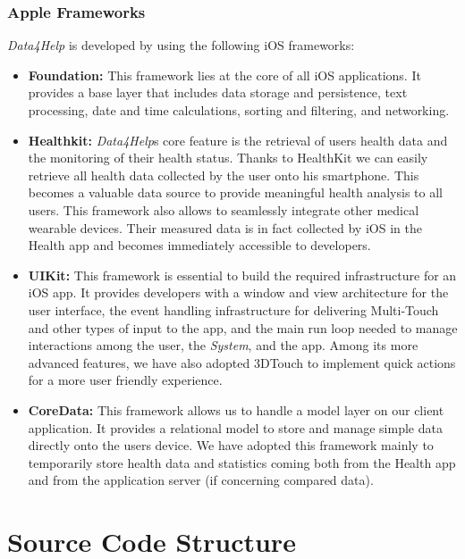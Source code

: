 \documentclass[titlepage]{article}
\begin{document}
	\subsubsection{Apple Frameworks}
	{\it Data4Help} is developed by using the following iOS frameworks:
	\begin{itemize}
		\item {\bf Foundation:}
		This framework lies at the core of all iOS applications. It provides a base layer that includes data storage and persistence, text processing, date and time calculations, sorting and filtering, and networking.
		\item {\bf Healthkit:}
		{\it Data4Help}\textsc{}s core feature is the retrieval of users\textsc{} health data and the monitoring of their health status. Thanks to HealthKit we can easily retrieve all health data collected by the user onto his smartphone. This becomes a valuable data source to provide meaningful health analysis to all users. This framework also allows to seamlessly integrate other medical wearable devices. Their measured data is in fact collected by iOS in the Health app and becomes immediately accessible to developers.
		\item {\bf UIKit:}
		This framework is essential to build the required infrastructure for an iOS app. It provides developers with a window and view architecture for the user interface, the event handling infrastructure for delivering Multi-Touch and other types of input to the app, and the main run loop needed to manage interactions among the user, the {\it System}, and the app. 
		Among its more advanced features, we have also adopted 3DTouch to implement quick actions for a more user friendly experience. 
		\item {\bf CoreData:}
		This framework allows us to handle a model layer on our client application. It provides a relational model to store and manage simple data directly onto the user\textsc{}s device. We have adopted this framework mainly to temporarily store health data and statistics coming both from the Health app and from the application server (if concerning compared data). 
	\end{itemize}
	
	\pagebreak
	\section{Source Code Structure}
\end{document}
